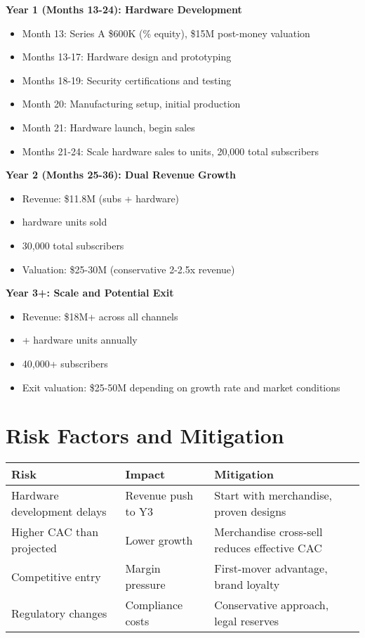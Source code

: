 \documentclass[11pt]{article}
\begin{document}
\textbf{Year 1 (Months 13-24): Hardware Development}
\begin{itemize}
  \item Month 13: Series A \$600K (\seriesAEquity\% equity), \$15M post-money valuation
  \item Months 13-17: Hardware design and prototyping
  \item Months 18-19: Security certifications and testing
  \item Month 20: Manufacturing setup, initial production
  \item Month 21: Hardware launch, begin sales
  \item Months 21-24: Scale hardware sales to \hwCustomersYearTwo{} units, 20,000 total subscribers
\end{itemize}

\textbf{Year 2 (Months 25-36): Dual Revenue Growth}
\begin{itemize}
  \item Revenue: \$11.8M (subs + hardware)
  \item \hwCustomersYearTwo{} hardware units sold
  \item 30,000 total subscribers
  \item Valuation: \$25-30M (conservative 2-2.5x revenue)
\end{itemize}

\textbf{Year 3+: Scale and Potential Exit}
\begin{itemize}
  \item Revenue: \$18M+ across all channels
  \item \hwCustomersYearThree+ hardware units annually
  \item 40,000+ subscribers
  \item Exit valuation: \$25-50M depending on growth rate and market conditions
\end{itemize}

\section{Risk Factors and Mitigation}

\begin{table}[H]
\centering
\begin{tabularx}{\linewidth}{l X X}
\toprule
Risk & Impact & Mitigation \\\midrule
Hardware development delays & Revenue push to Y3 & Start with merchandise, proven designs \\
Higher CAC than projected & Lower growth & Merchandise cross-sell reduces effective CAC \\
Competitive entry & Margin pressure & First-mover advantage, brand loyalty \\
Regulatory changes & Compliance costs & Conservative approach, legal reserves \\
\bottomrule
\end{tabularx}
\end{table}

\printbibliography
\end{document}
